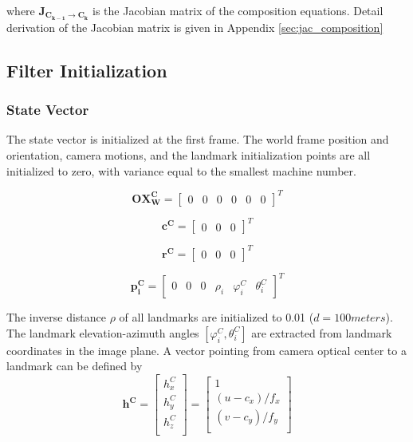 \noindent where $\boldsymbol{J_{C_{k-1} \to C_k}}$ is the Jacobian matrix of the
composition equations. Detail derivation of the Jacobian matrix is
given in Appendix \ref{sec:jac_composition}  

\subsection{Filter Initialization} \label{sec:filter_initialization}
\subsubsection{State Vector}

The state vector is initialized at the first frame. The world frame
position and orientation, camera motions, and the landmark
initialization points are all initialized to zero, with variance
equal to the smallest machine number.

\begin{equation}
\label{eq:OX_init}
\boldsymbol{OX_{W}^{C}}=\begin{bmatrix}0&0&0&0&0&0\end{bmatrix}^T 
\end{equation}

\begin{equation}
\boldsymbol{c^{C}}=\begin{bmatrix}0&0&0\end{bmatrix}^T
\end{equation}

\begin{equation}
\boldsymbol{r^{C}}=\begin{bmatrix}0&0&0\end{bmatrix}^T
\end{equation}

\begin{equation}
\label{eq:pi_init}
\boldsymbol{p_{i}^{C}}=\begin{bmatrix}0&0&0&\rho _{i}&\varphi_{i}^C&\theta_{i}^C\end{bmatrix}^T
\end{equation}

The inverse distance $\rho$ of all landmarks are initialized to 0.01
($d=100 meters$). The landmark elevation-azimuth angles $[\varphi _{i}^{C},
\theta _{i}^{C}]$ are extracted from landmark coordinates in the image
plane. A vector pointing from camera optical center to a landmark
can be defined by
\begin{equation}
\label{eq:init_landmark_unit_vec}
\boldsymbol{h^{C}}=\begin{bmatrix}
h_{x}^{C}\\
h_{y}^{C}\\
h_{z}^{C}\\
\end{bmatrix}
 = \begin{bmatrix}
1 \\
(u-c_x)/f_{x} \\
(v-c_y)/f_{y} \\
\end{bmatrix}
\end{equation}

